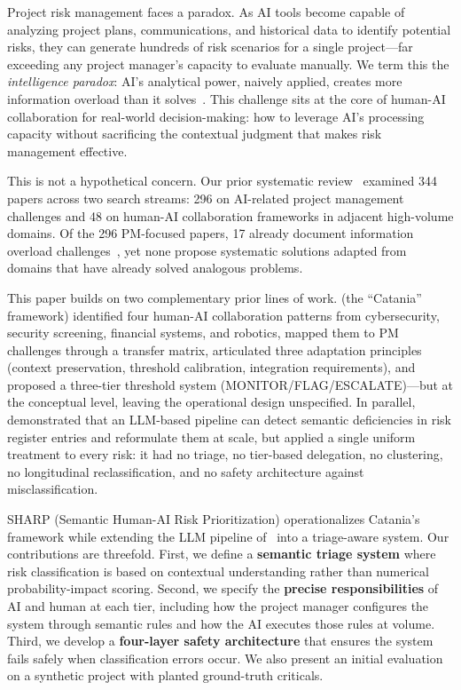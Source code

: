 \documentclass[runningheads]{llncs}
\begin{document}
Project risk management faces a paradox. As AI tools become capable of analyzing project plans, communications, and historical data to identify potential risks, they can generate hundreds of risk scenarios for a single project---far exceeding any project manager's capacity to evaluate manually. We term this the \emph{intelligence paradox}: AI's analytical power, naively applied, creates more information overload than it solves~\cite{bara2025catania}. This challenge sits at the core of human-AI collaboration for real-world decision-making: how to leverage AI's processing capacity without sacrificing the contextual judgment that makes risk management effective.

This is not a hypothetical concern. Our prior systematic review~\cite{bara2025catania} examined 344 papers across two search streams: 296 on AI-related project management challenges and 48 on human-AI collaboration frameworks in adjacent high-volume domains. Of the 296 PM-focused papers, 17 already document information overload challenges~\cite{annexure2024,km2024,aidecision2025,responsibleai2024}, yet none propose systematic solutions adapted from domains that have already solved analogous problems.

This paper builds on two complementary prior lines of work. \cite{bara2025catania} (the ``Catania'' framework) identified four human-AI collaboration patterns from cybersecurity, security screening, financial systems, and robotics, mapped them to PM challenges through a transfer matrix, articulated three adaptation principles (context preservation, threshold calibration, integration requirements), and proposed a three-tier threshold system (MONITOR/FLAG/ESCALATE)---but at the conceptual level, leaving the operational design unspecified. In parallel, \cite{bara2025augmenting} demonstrated that an LLM-based pipeline can detect semantic deficiencies in risk register entries and reformulate them at scale, but applied a single uniform treatment to every risk: it had no triage, no tier-based delegation, no clustering, no longitudinal reclassification, and no safety architecture against misclassification.

SHARP (Semantic Human-AI Risk Prioritization) operationalizes Catania's framework while extending the LLM pipeline of~\cite{bara2025augmenting} into a triage-aware system. Our contributions are threefold. First, we define a \textbf{semantic triage system} where risk classification is based on contextual understanding rather than numerical probability-impact scoring. Second, we specify the \textbf{precise responsibilities} of AI and human at each tier, including how the project manager configures the system through semantic rules and how the AI executes those rules at volume. Third, we develop a \textbf{four-layer safety architecture} that ensures the system fails safely when classification errors occur. We also present an initial evaluation on a synthetic project with planted ground-truth criticals.
\end{document}
